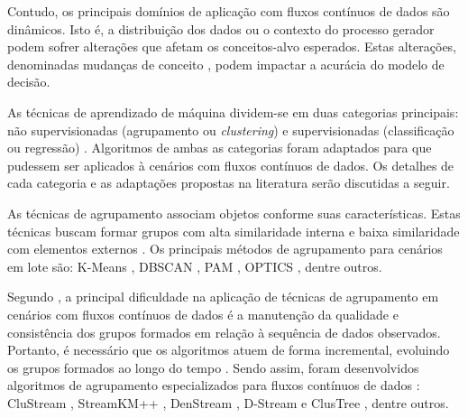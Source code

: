 \documentclass[qual, classic, a4paper]{ufbathesis}
\begin{document}
Contudo, os principais domínios de aplicação com fluxos contínuos de dados são dinâmicos.
Isto é, a distribuição dos dados ou o contexto do processo gerador podem sofrer alterações que afetam os conceitos-alvo esperados.
Estas alterações, denominadas mudanças de conceito \cite{Gama:2010:KDD:1855075}, podem impactar a acurácia do modelo de decisão.



As técnicas de aprendizado de máquina dividem-se em duas categorias principais: 
não supervisionadas (agrupamento ou \textit{clustering}) e supervisionadas (classificação ou regressão) \cite{Mitchell:1997:ML:541177}.
Algoritmos de ambas as categorias foram adaptados para que pudessem ser aplicados à cenários com fluxos contínuos de dados.
Os detalhes de cada categoria e as adaptações propostas na literatura serão discutidas a seguir.

As técnicas de agrupamento associam objetos conforme suas características.
Estas técnicas buscam formar grupos com alta similaridade interna e baixa similaridade com elementos externos \cite{Jain:1988:ACD:46712}.
Os principais métodos de agrupamento para cenários em lote são:
K-Means \cite{Lloyd:2006:LSQ:2263356.2269955},
DBSCAN \cite{Ester:1996:DAD:3001460.3001507},
PAM \cite{kaufman:clustering1990},
OPTICS \cite{Ankerst:1999:OOP:304181.304187}, dentre outros.

Segundo \cite{Gama:2010:KDD:1855075}, a principal dificuldade na aplicação de técnicas de agrupamento em cenários com fluxos contínuos de dados  
é a manutenção da qualidade e consistência dos grupos formados em relação à sequência de dados observados. 
Portanto, é necessário que os algoritmos atuem de forma incremental, evoluindo os grupos formados ao longo do tempo \cite{Barbara:2002:RCD:507515.507519}.
Sendo assim, foram desenvolvidos algoritmos de agrupamento especializados para fluxos contínuos de dados \cite{Aggarwal:2003:FCE:1315451.1315460}:
CluStream \cite{Aggarwal:2003:FCE:1315451.1315460},
StreamKM++ \cite{Ackermann:2012:SCA:2133803.2184450},
DenStream \cite{Cao:Feng:Ester},
D-Stream \cite{Chen:Tu} e ClusTree \cite{Kranen:2011:CIM:2134350.2134352}, dentre outros.
\end{document}
